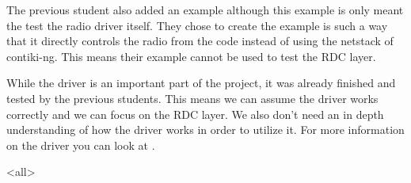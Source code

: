 The previous student also added an example although this example is only meant the test the radio driver itself. They chose to create the example is such a way that it directly controls the radio from the code instead of using the netstack of contiki-ng. This means their example cannot be used to test the RDC layer. 

While the driver is an important part of the project, it was already finished and tested by the previous students. This means we can assume the driver works correctly and we can focus on the RDC layer. We also don't need an in depth understanding of how the driver works in order to utilize it. For more information on the driver you can look at \cite{peetersRADIODUTYCYCLING2022}.



\mode<all> %